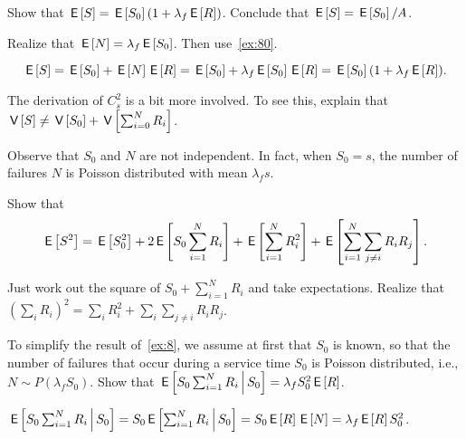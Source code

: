 \begin{extra}
 Show that $\,\mathsf{E}\left[S\right] = \,\mathsf{E}\left[S_0\right] (1+\lambda_f \,\mathsf{E}\left[R\right])$.
 Conclude that $\,\mathsf{E}\left[S\right] = \,\mathsf{E}\left[S_0\right]/A$.
\begin{hint}
 Realize that $\,\mathsf{E}\left[N\right] = \lambda_f \,\mathsf{E}\left[S_0\right]$. Then use~\cref{ex:80}.
\end{hint}
\begin{solution}
 \begin{equation*}
 \,\mathsf{E}\left[S\right] = \,\mathsf{E}\left[S_0\right] + \,\mathsf{E}\left[N\right] \,\mathsf{E}\left[R\right] = \,\mathsf{E}\left[S_0\right] + \lambda_f \,\mathsf{E}\left[S_0\right] \,\mathsf{E}\left[R\right]= \,\mathsf{E}\left[S_0\right](1+\lambda_f \,\mathsf{E}\left[R\right]).
 \end{equation*}
\end{solution}
\end{extra}


\begin{exercise}
 The derivation of $C_s^2$ is a bit more involved.
 To see this, explain that $\,\mathsf{V}\left[S\right] \neq \,\mathsf{V}\left[S_0\right] + \,\mathsf{V}\left[\sum_{i=0}^N R_i\right]$.
\begin{solution}
 Observe that $S_0$ and $N$ are not independent. In fact, when $S_0=s$, the number of failures $N$ is Poisson distributed with mean $\lambda_f s$. 
\end{solution}
\end{exercise}



\begin{extra}
Show that 
\begin{equation*}
 \,\mathsf{E}\left[S^2\right] = \,\mathsf{E}\left[S_0^2\right] + 2\,\mathsf{E}\left[S_0 \sum_{i=1}^N R_i\right] + \,\mathsf{E}\left[\sum_{i=1}^N R_i^2\right] + \,\mathsf{E}\left[\sum_{i=1}^N \sum_{j\neq i} R_i R_j\right].
\end{equation*}
\begin{solution}
 Just work out the square of $S_0+\sum_{i=1}^N R_i$ and take expectations. Realize that $(\sum_i R_i)^2 = \sum_i R_i^2 + \sum_i\sum_{j\neq i} R_i R_j$. 
\end{solution}
\end{extra}


\begin{extra}
 To simplify the result of~\cref{ex:8}, we assume at first that $S_0$ is known, so that the number of failures that occur during a service time $S_0$ is Poisson distributed, i.e., $N\sim P(\lambda_f S_0)$.
 Show that $\,\mathsf{E}\left[S_0 \sum_{i=1}^N R_i\,\middle|\, S_0\right] = \lambda_f S_0^2 \,\mathsf{E}\left[R\right]$.
\begin{solution}
$\,\mathsf{E}\left[S_0 \sum_{i=1}^N R_i\,\middle|\, S_0\right] = 
S_0 \,\mathsf{E}\left[\sum_{i=1}^N R_i\,\middle|\, S_0\right] = S_0 \,\mathsf{E}\left[R\right] \,\mathsf{E}\left[N\right] = \lambda_f \,\mathsf{E}\left[R\right] S_0^2$.
\end{solution}
\end{extra}

